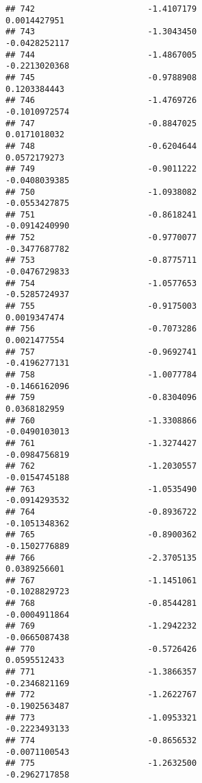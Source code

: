 \documentclass[
]{article}
\begin{document}
\begin{verbatim}
## 742                       -1.4107179                          0.0014427951
## 743                       -1.3043450                         -0.0428252117
## 744                       -1.4867005                         -0.2213020368
## 745                       -0.9788908                          0.1203384443
## 746                       -1.4769726                         -0.1010972574
## 747                       -0.8847025                          0.0171018032
## 748                       -0.6204644                          0.0572179273
## 749                       -0.9011222                         -0.0408039385
## 750                       -1.0938082                         -0.0553427875
## 751                       -0.8618241                         -0.0914240990
## 752                       -0.9770077                         -0.3477687782
## 753                       -0.8775711                         -0.0476729833
## 754                       -1.0577653                         -0.5285724937
## 755                       -0.9175003                          0.0019347474
## 756                       -0.7073286                          0.0021477554
## 757                       -0.9692741                         -0.4196277131
## 758                       -1.0077784                         -0.1466162096
## 759                       -0.8304096                          0.0368182959
## 760                       -1.3308866                         -0.0490103013
## 761                       -1.3274427                         -0.0984756819
## 762                       -1.2030557                         -0.0154745188
## 763                       -1.0535490                         -0.0914293532
## 764                       -0.8936722                         -0.1051348362
## 765                       -0.8900362                         -0.1502776889
## 766                       -2.3705135                          0.0389256601
## 767                       -1.1451061                         -0.1028829723
## 768                       -0.8544281                         -0.0004911864
## 769                       -1.2942232                         -0.0665087438
## 770                       -0.5726426                          0.0595512433
## 771                       -1.3866357                         -0.2346821169
## 772                       -1.2622767                         -0.1902563487
## 773                       -1.0953321                         -0.2223493133
## 774                       -0.8656532                         -0.0071100543
## 775                       -1.2632500                         -0.2962717858

\end{verbatim}
\end{document}
